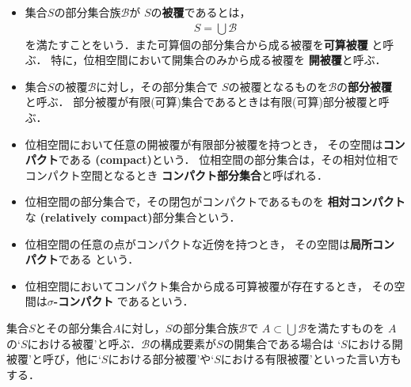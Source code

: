 	\begin{screen}
		\begin{dfn}\mbox{}
			\begin{itemize}
				\item
					集合$S$の部分集合族$\mathscr{B}$が
					$S$の{\bf 被覆}であるとは，
					\begin{align}
						S = \bigcup \mathscr{B}
					\end{align}
					を満たすことをいう．また可算個の部分集合から成る被覆を{\bf 可算被覆}
					と呼ぶ．
					特に，位相空間において開集合のみから成る被覆を
					{\bf 開被覆}と呼ぶ．
				
				\item 集合$S$の被覆$\mathscr{B}$に対し，その部分集合で
					$S$の被覆となるものを$\mathscr{B}$の{\bf 部分被覆}
					と呼ぶ．
					部分被覆が有限(可算)集合であるときは有限(可算)部分被覆と呼ぶ．
				\item 
					位相空間において任意の開被覆が有限部分被覆を持つとき，
					その空間は{\bf コンパクト}である
					{\bf (compact)}という．
					位相空間の部分集合は，その相対位相でコンパクト空間となるとき
					{\bf コンパクト部分集合}と呼ばれる．
				
				\item 位相空間の部分集合で，その閉包がコンパクトであるものを
					{\bf 相対コンパクト}な
					{\bf (relatively compact)}部分集合という．
				
				\item 位相空間の任意の点がコンパクトな近傍を持つとき，
					その空間は{\bf 局所コンパクト}である
					という．
					
				\item 位相空間においてコンパクト集合から成る可算被覆が存在するとき，
					その空間は{\bf $\sigma$-コンパクト}
					であるという．
			\end{itemize}
		\end{dfn}
	\end{screen}
	
	集合$S$とその部分集合$A$に対し，$S$の部分集合族$\mathscr{B}$で
	$A \subset \bigcup \mathscr{B}$を満たすものを
	$A$の`$S$における被覆'と呼ぶ．$\mathscr{B}$の構成要素が$S$の開集合である場合は
	`$S$における開被覆'と呼び，他に`$S$における部分被覆'や`$S$における有限被覆'といった言い方もする．
	

